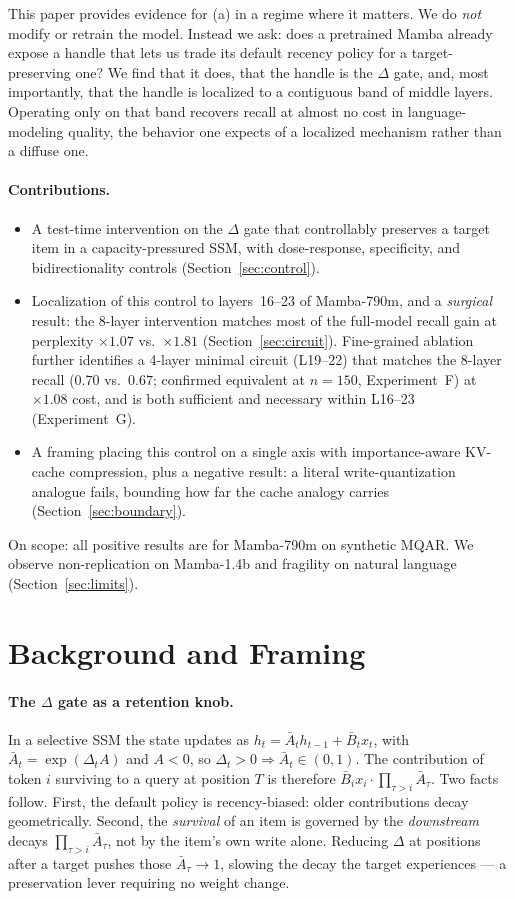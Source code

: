 \documentclass{article}
\begin{document}
This paper provides evidence for (a) in a regime where it matters. We do
\emph{not} modify or retrain the model. Instead we ask: does a pretrained Mamba
already expose a handle that lets us trade its default recency policy for a
target-preserving one? We find that it does, that the handle is the $\Delta$
gate, and, most importantly, that the handle is localized to a contiguous
band of middle layers. Operating only on that band recovers recall at almost no
cost in language-modeling quality, the behavior one expects of a localized
mechanism rather than a diffuse one.

\paragraph{Contributions.}
\begin{itemize}
\item A test-time intervention on the $\Delta$ gate that controllably preserves a
target item in a capacity-pressured SSM, with dose-response, specificity, and
bidirectionality controls (Section~\ref{sec:control}).
\item Localization of this control to layers~16--23 of Mamba-790m, and a
\emph{surgical} result: the 8-layer intervention matches most of the full-model
recall gain at perplexity $\times 1.07$ vs.\ $\times 1.81$
(Section~\ref{sec:circuit}). Fine-grained ablation further identifies a 4-layer
minimal circuit (L19--22) that matches the 8-layer recall ($0.70$ vs.\ $0.67$;
confirmed equivalent at $n{=}150$, Experiment~F) at $\times 1.08$ cost,
and is both sufficient and necessary within L16--23 (Experiment~G).
\item A framing placing this control on a single axis with importance-aware
KV-cache compression, plus a negative result: a literal
write-quantization analogue fails, bounding how far the cache analogy carries
(Section~\ref{sec:boundary}).
\end{itemize}
On scope: all positive results are for Mamba-790m on synthetic
MQAR. We observe non-replication on Mamba-1.4b and fragility on natural language
(Section~\ref{sec:limits}).

\section{Background and Framing}
\paragraph{The $\Delta$ gate as a retention knob.}
In a selective SSM the state updates as
$h_t = \bar{A}_t h_{t-1} + \bar{B}_t x_t$, with $\bar{A}_t = \exp(\Delta_t A)$ and
$A<0$, so $\Delta_t>0 \Rightarrow \bar{A}_t \in (0,1)$. The contribution of token
$i$ surviving to a query at position $T$ is therefore
$\bar{B}_i x_i \cdot \prod_{\tau>i}\bar{A}_\tau$. Two facts follow. First, the
default policy is recency-biased: older contributions decay geometrically.
Second, the \emph{survival} of an item is governed by the \emph{downstream}
decays $\prod_{\tau>i}\bar{A}_\tau$, not by the item's own write alone. Reducing
$\Delta$ at positions after a target pushes those $\bar{A}_\tau \to 1$, slowing
the decay the target experiences --- a preservation lever requiring no weight
change.
\end{document}

